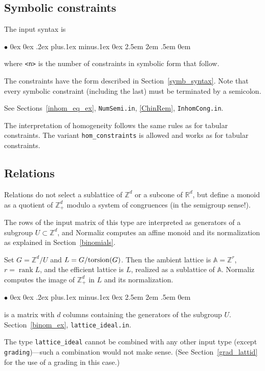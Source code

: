 \documentclass[12pt,a4paper]{scrartcl}
\newcommand{\stdli}{ \topsep0ex \partopsep0ex %
\parsep.2ex plus.1ex minus.1ex \itemsep0ex%
\leftmargin2.5em \labelwidth2em \labelsep.5em \rightmargin0em}%
\renewenvironment{itemize}{\begin{list}{{$\bullet$}}{\stdli}}{\end{list}}
\theoremstyle{definition}
\def\ZZ{{\mathbb Z}}
\def\RR{{\mathbb R}}
\def\AA{{\mathbb A}}
\DeclareMathOperator{\rank}{rank}
\def\itemtt[#1]{\item[\textbf{\ttt{#1}}]}
\def\ttt{\texttt}
\begin{document}
\subsection{Symbolic constraints}

The input syntax is

\begin{itemize}
	\itemtt[constraints <n> symbolic] where \verb|<n>| is the number of constraints in symbolic form that follow.
\end{itemize}

The constraints have the form described in Section~\ref{symb_syntax}. Note that every symbolic constraint (including the last) must be terminated by a semicolon.

See Sections~\ref{inhom_eq_ex}, \verb|NumSemi.in|, \ref{ChinRem}, \verb|InhomCong.in|.

The interpretation of homogeneity follows the same rules as for tabular constraints. The variant \verb|hom_constraints| is allowed and works as for tabular constraints.


\subsection{Relations}\label{relations}

Relations do not select a
sublattice of $\ZZ^d$ or a subcone of $\RR^d$, but define a
monoid as a quotient of $\ZZ_+^d$ modulo a system of
congruences (in the semigroup sense!).

The rows of the input matrix of this type are interpreted as
generators of a subgroup $U\subset\ZZ^d$, and Normaliz computes an affine monoid and its normalization as explained in Section~\ref{binomials}.

Set $G=\ZZ^d/U$ and $L=G/\textup{torsion}(G)$. Then the ambient lattice
is $\AA=\ZZ^r$, $r=\rank L$, and the efficient lattice is $L$, realized
as a sublattice of $\AA$. Normaliz computes the image of $\ZZ^d_+$ in $L$ and its normalization.

\begin{itemize}
	\itemtt[lattice\_ideal] is a matrix with $d$ columns containing the generators of the subgroup $U$. Section~\ref{binom_ex}, \verb|lattice_ideal.in|.
\end{itemize}

The type \ttt{lattice\_ideal} cannot be combined with any other input type (except
\ttt{grading})---such a combination would not make sense. (See Section~\ref{grad_lattid} for the use of a grading in this case.)
\end{document}
